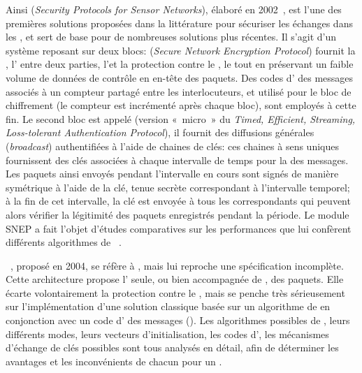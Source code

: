 Ainsi  (\textit{Security Protocols for Sensor Networks}), élaboré en 2002~\cite{PSWCT02}, est l'une des premières solutions proposées dans la littérature pour sécuriser les échanges dans les \rcs, et sert de base pour de nombreuses solutions plus récentes.
Il s'agit d'un système reposant sur deux blocs:  (\textit{Secure Network Encryption Protocol}) fournit la , l' entre deux parties, l'\integrite et la protection contre le , le tout en préservant un faible volume de données de contrôle en en-tête des paquets.
Des codes d' des messages associés à un compteur partagé entre les interlocuteurs, et utilisé pour le bloc de chiffrement (le compteur est incrémenté après chaque bloc), sont employés à cette fin.
Le second bloc est appelé  (version « micro » du \textit{Timed, Efficient, Streaming, Loss-tolerant Authentication Protocol}), il fournit des diffusions générales (\textit{broadcast}) authentifiées à l'aide de chaines de clés: ces chaines à sens uniques fournissent des clés associées à chaque intervalle de temps pour la  des messages.
Les paquets ainsi envoyés pendant l'intervalle en cours sont signés de manière symétrique à l'aide de la clé, tenue secrète correspondant à l'intervalle temporel; à la fin de cet intervalle, la clé est envoyée à tous les correspondants qui peuvent alors vérifier la légitimité des paquets enregistrés pendant la période.
Le module SNEP a fait l'objet d'études comparatives sur les performances que lui confèrent différents algorithmes de ~\cite{SS14-snep}.

~\cite{KSW04}, proposé en 2004, se réfère à , mais lui reproche une spécification incomplète.
Cette architecture propose l' seule, ou bien accompagnée de , des paquets.
Elle écarte volontairement la protection contre le , mais se penche très sérieusement sur l'implémentation d'une solution classique basée sur un algorithme de  en conjonction avec un code d' des messages (\macc).
Les algorithmes possibles de , leurs différents modes, leurs vecteurs d'initialisation, les codes d', les mécanismes d'échange de clés possibles sont tous analysés en détail, afin de déterminer les avantages et les inconvénients de chacun pour un \rc.

